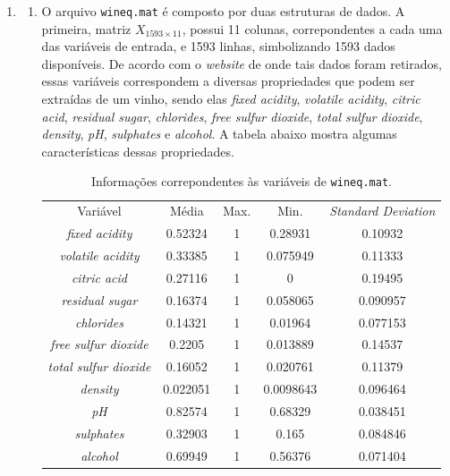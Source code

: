 \begin{enumerate}
		\item \begin{enumerate}
		  \item O arquivo \texttt{wineq.mat} é composto por duas estruturas de dados.
		  A primeira, matriz \(X_{1593 \times 11}\), possui 11 colunas, correpondentes
		  a cada uma das variáveis de entrada, e 1593 linhas, simbolizando 1593 dados
		  disponíveis. De acordo com o \textit{website} de onde tais dados foram
		  retirados, essas variáveis correspondem a diversas propriedades que podem
		  ser extraídas de um vinho, sendo elas \textit{fixed acidity},
		  \textit{volatile acidity}, \textit{citric acid}, \textit{residual sugar},
		  \textit{chlorides}, \textit{free sulfur dioxide}, \textit{total sulfur
		  dioxide}, \textit{density}, \textit{pH}, \textit{sulphates} e
		  \textit{alcohol}. A tabela abaixo mostra algumas características dessas
		  propriedades.
		  
		  \begin{table}[H]
			    \centering
				\caption{\label{tab:wineq.mat} Informações correpondentes às variáveis de
				\texttt{wineq.mat}.}
				\begin{tabular}{| c | c |  c | c | c |}
				
				\hline
				Variável & Média & Max. & Min. & \textit{Standard Deviation} \\ \hhline{|=|=|=|=|=|} 
				\textit{fixed acidity} & 0.52324 & 1 & 0.28931 &
				0.10932 \\ \hline \textit{volatile acidity} & 0.33385 & 1 & 0.075949 & 0.11333 \\ \hline
				 \textit{citric acid} & 0.27116 & 1 & 0 & 0.19495 \\ \hline
				 \textit{residual sugar} & 0.16374 & 1 & 0.058065 & 0.090957 \\ \hline
				 \textit{chlorides} & 0.14321 & 1 & 0.01964 & 0.077153 \\ \hline
				 \textit{free sulfur dioxide} & 0.2205 & 1 & 0.013889 & 0.14537 \\ \hline
				 \textit{total sulfur dioxide}& 0.16052 & 1 & 0.020761 & 0.11379 \\ \hline
				 \textit{density} & 0.022051 & 1 & 0.0098643 & 0.096464 \\ \hline
				  \textit{pH} & 0.82574 & 1 & 0.68329 & 0.038451 \\ \hline
				 \textit{sulphates}& 0.32903 & 1 & 0.165 & 0.084846 \\ \hline
				 \textit{alcohol} & 0.69949 & 1 & 0.56376 & 0.071404 \\ \hline
				

\end{tabular}
\end{table}
\end{enumerate}
\end{enumerate}
